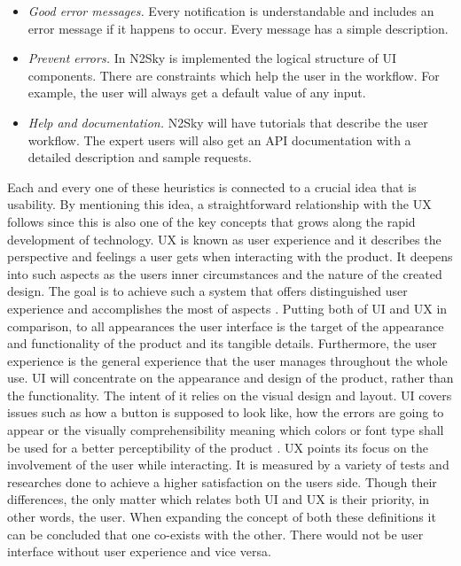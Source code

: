 \begin{itemize}
\item \emph{Good error messages.} Every notification is understandable and includes an error message if it happens to occur. Every message has a simple description.
\item \emph{Prevent errors.} In N2Sky is implemented the logical structure of UI components. There are constraints which help the user in the workflow. For example, the user will always get a default value of any input.
\item \emph{Help and documentation.} N2Sky will have tutorials that describe the user workflow. The expert users will also get an API documentation with a detailed description and sample requests. 

\end{itemize}

Each and every one of these heuristics is connected to a crucial idea that is usability. By mentioning this idea, a straightforward relationship with the UX follows since this is also one of the key concepts that grows along the rapid development of technology. UX is known as user experience and it describes the perspective and feelings a user gets when interacting with the product. It deepens into such aspects as the users inner circumstances and the nature of the created design. The goal is to achieve such a system that offers distinguished user experience and accomplishes the most of aspects \cite{uixagenda}.
Putting both of UI and UX in comparison, to all appearances the user interface is the target of the appearance and functionality of the product and its tangible details.  Furthermore, the user experience is the general experience that the user manages throughout the whole use. 
UI will concentrate on the appearance and design of the product, rather than the functionality. The intent of it relies on the visual design and layout. UI covers issues such as how a button is supposed to look like, how the errors are going to appear or the visually comprehensibility meaning which colors or font type shall be used for a better perceptibility of the product \cite{humanpc}. 
UX points its focus on the involvement of the user while interacting. It is measured by a variety of tests and researches done to achieve a higher satisfaction on the users side.
Though their differences, the only matter which relates both UI and UX is their priority, in other words, the user. When expanding the concept of both these definitions it can be concluded that one co-exists with the other. There would not be user interface without user experience and vice versa. 

